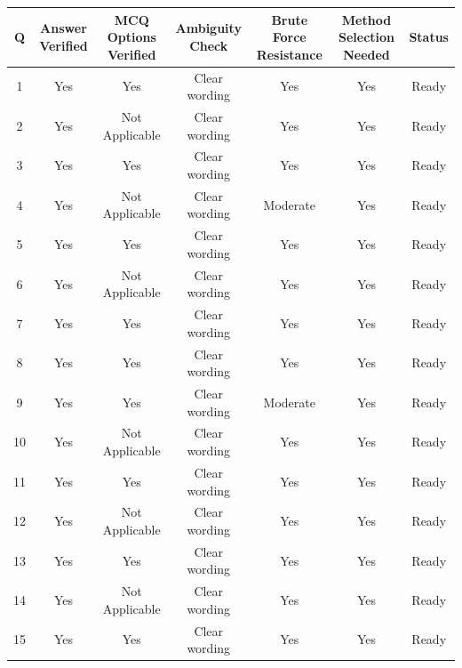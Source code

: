 \documentclass[11pt,a4paper]{article}
\begin{document}
\begin{center}
\renewcommand{\arraystretch}{1.2}
\small
\begin{tabular}{|c|c|c|c|c|c|c|}
\hline
\textbf{Q} & \textbf{Answer Verified} & \textbf{MCQ Options Verified} & \textbf{Ambiguity Check} & \textbf{Brute Force Resistance} & \textbf{Method Selection Needed} & \textbf{Status} \\
\hline
1  & Yes & Yes            & Clear wording & Yes      & Yes & Ready \\
2  & Yes & Not Applicable & Clear wording & Yes      & Yes & Ready \\
3  & Yes & Yes            & Clear wording & Yes      & Yes & Ready \\
4  & Yes & Not Applicable & Clear wording & Moderate & Yes & Ready \\
5  & Yes & Yes            & Clear wording & Yes      & Yes & Ready \\
6  & Yes & Not Applicable & Clear wording & Yes      & Yes & Ready \\
7  & Yes & Yes            & Clear wording & Yes      & Yes & Ready \\
8  & Yes & Yes            & Clear wording & Yes      & Yes & Ready \\
9  & Yes & Yes            & Clear wording & Moderate & Yes & Ready \\
10 & Yes & Not Applicable & Clear wording & Yes      & Yes & Ready \\
11 & Yes & Yes            & Clear wording & Yes      & Yes & Ready \\
12 & Yes & Not Applicable & Clear wording & Yes      & Yes & Ready \\
13 & Yes & Yes            & Clear wording & Yes      & Yes & Ready \\
14 & Yes & Not Applicable & Clear wording & Yes      & Yes & Ready \\
15 & Yes & Yes            & Clear wording & Yes      & Yes & Ready \\
\hline
\end{tabular}
\end{center}
\end{document}
